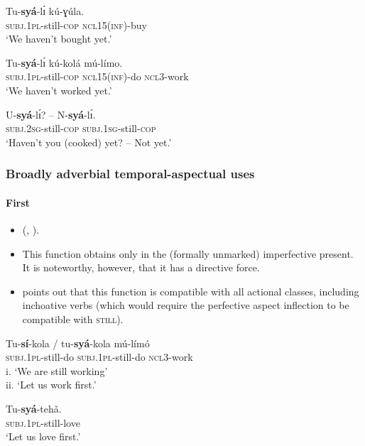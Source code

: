 \begin{exe}
	\ex\label{exAppendixBendeNotYet1}
	\gll Tu-\textbf{syá}-lɪ́ kú-ɣúla.\\
	\textsc{subj}.1\textsc{pl}-still-\textsc{cop} \textsc{ncl15}(\textsc{inf})-buy\\
	\glt \lq We haven't bought yet.' \parencite[26]{Abe2015}

	\ex\label{exAppendixBendeNotYet2}
	\gll Tu-\textbf{syá}-lɪ́ kú-kolá mú-límo.\\
	\textsc{subj}.1\textsc{pl}-still-\textsc{cop} \textsc{ncl15}(\textsc{inf})-do \textsc{ncl}3-work\\
	\glt \lq We haven't worked yet.' \parencite[26]{Abe2015}

	\ex\label{exAppendixBendeNotYet3}
	\gll U-\textbf{syá}-lɪ́? – N-\textbf{syá}-lɪ́.\\
	\textsc{subj}.2\textsc{sg}-still-\textsc{cop} {} \textsc{subj}.1\textsc{sg}-still-\textsc{cop}\\
	\glt \lq Haven't you (cooked) yet? -- Not yet.' \parencite[26]{Abe2015}
\end{exe}

\subsubsection{Broadly adverbial temporal-aspectual uses}

\paragraph{First}\label{appendixBendeFirst}
\begin{itemize}
	\item  \citeauthor{Abe2015} (\citeyear{Abe2015}, \citeyear{Abe2016}).
	\item  This function obtains only in the (formally unmarked) imperfective present. It is noteworthy, however, that it has a directive force.
	\item \textcite{Abe2016} points out that this function is compatible with all actional classes, including inchoative verbs (which would require the perfective aspect inflection to be compatible with \textsc{still}).
\end{itemize}

\begin{exe}
	\ex \gll Tu-\textbf{sí}-kola / tu-\textbf{syá}-kola mú-límó\\
	\textsc{subj}.1\textsc{pl}-still-do {} \textsc{subj}.1\textsc{pl}-still-do \textsc{ncl}3-work\\
	\glt i.\phantom{i} \lq We are still working'\\
	ii. \lq Let us work first.' \parencite[29]{Abe2015}
	
	\ex \gll Tu-\textbf{syá}-tehǎ.\\
	\textsc{subj}.1\textsc{pl}-still-love\\
	\glt \lq Let us love first.\rq{ }\parencite{Abe2016}
\end{exe}

